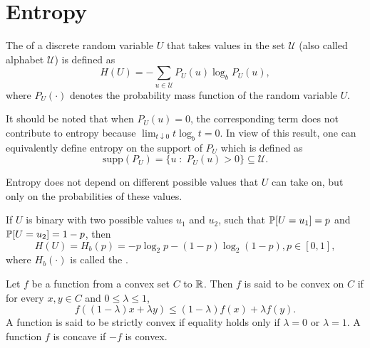 \documentclass[11pt,a4paper]{article}
\begin{document}
\nocite{*}

\section{Entropy}

\begin{definition}
    The  of a discrete random variable $U$ that takes values in the set $\mathcal{U}$ (also called alphabet $\mathcal{U}$) is defined as 
    \begin{equation*}
        H(U) = -\sum_{u\in \mathcal{U}} P_U(u) \log_b P_U(u),
    \end{equation*}
    where $P_U(\cdot)$ denotes the probability mass function of the random variable $U$.
\end{definition}

\begin{remark}
    It should be noted that when $P_U(u) = 0$, the corresponding term does not contribute to entropy because $\lim_{t\downarrow 0} t\log_b t = 0$. In view of this result, one can equivalently define entropy on the support of $P_U$ which is defined as
    \begin{equation*}
        \text{supp}(P_U) = \{u\;:\; P_U(u)>0 \} \subseteq \mathcal{U}.
    \end{equation*}
\end{remark}

\begin{remark}
    Entropy does not depend on different possible values that $U$ can take on, but only on the probabilities of these values.
\end{remark}

\begin{definition}
    If $U$ is binary with two possible values $u_1$ and $u_2$, such that $\mathbb{P}[U = u_1] = p$ and $\mathbb{P}[U = u_2] = 1-p$, then 
    \begin{equation*}
        H(U) = H_b(p) = -p\log_2 p -(1-p)\log_2 (1-p), p\in[0,1],
    \end{equation*}
    where $H_b(\cdot)$ is called the .
\end{definition}

\begin{definition}
    Let $f$ be a function from a convex set $C$ to $\mathbb{R}$. Then $f$ is said to be convex on $C$ if for every $x,y\in C$ and $0\le\lambda \le 1$,
    \begin{equation*}
        f((1-\lambda)x+\lambda y) \le (1-\lambda) f(x) + \lambda f(y).
    \end{equation*} 
    A function is said to be strictly convex if equality holds only if $\lambda = 0$ or $\lambda = 1$. A function $f$ is concave if $-f$ is convex.
\end{definition}
\end{document}
